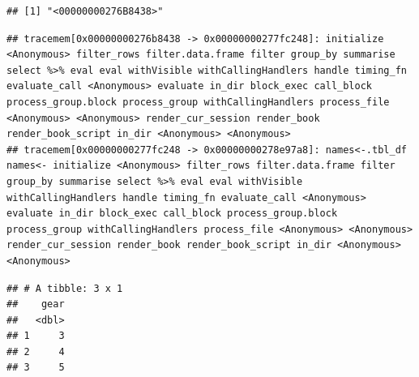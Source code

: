 \documentclass[
]{book}
\newenvironment{Shaded}{\begin{snugshade}}{\end{snugshade}}
\newcommand{\DecValTok}[1]{\textcolor[rgb]{0.00,0.00,0.81}{#1}}
\newcommand{\DocumentationTok}[1]{\textcolor[rgb]{0.56,0.35,0.01}{\textbf{\textit{#1}}}}
\newcommand{\FunctionTok}[1]{\textcolor[rgb]{0.00,0.00,0.00}{#1}}
\newcommand{\NormalTok}[1]{#1}
\newcommand{\OtherTok}[1]{\textcolor[rgb]{0.56,0.35,0.01}{#1}}
\newcommand{\SpecialCharTok}[1]{\textcolor[rgb]{0.00,0.00,0.00}{#1}}
\begin{document}
\begin{verbatim}
## [1] "<00000000276B8438>"
\end{verbatim}

\begin{Shaded}
\end{Shaded}

\begin{verbatim}
## tracemem[0x00000000276b8438 -> 0x00000000277fc248]: initialize <Anonymous> filter_rows filter.data.frame filter group_by summarise select %>% eval eval withVisible withCallingHandlers handle timing_fn evaluate_call <Anonymous> evaluate in_dir block_exec call_block process_group.block process_group withCallingHandlers process_file <Anonymous> <Anonymous> render_cur_session render_book render_book_script in_dir <Anonymous> <Anonymous> 
## tracemem[0x00000000277fc248 -> 0x00000000278e97a8]: names<-.tbl_df names<- initialize <Anonymous> filter_rows filter.data.frame filter group_by summarise select %>% eval eval withVisible withCallingHandlers handle timing_fn evaluate_call <Anonymous> evaluate in_dir block_exec call_block process_group.block process_group withCallingHandlers process_file <Anonymous> <Anonymous> render_cur_session render_book render_book_script in_dir <Anonymous> <Anonymous>
\end{verbatim}

\begin{verbatim}
## # A tibble: 3 x 1
##    gear
##   <dbl>
## 1     3
## 2     4
## 3     5
\end{verbatim}
\end{document}
